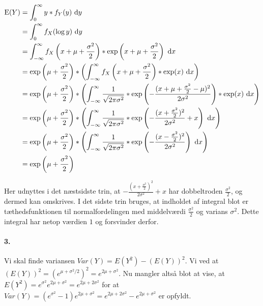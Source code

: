 \begin{align*}
\mathrm{E}(Y)
&= \int_0^\infty y*f_Y(y)\ \mathrm{d} y \\
&= \int_0^\infty f_X(\log y)\ \mathrm{d} y \\
&= \int_{-\infty}^\infty
     f_X\left(x + \mu + \frac{\sigma^2}{2}\right) *
     \mathrm{exp}\left(x + \mu + \frac{\sigma^2}{2}\right)
   \ \mathrm{d} x \\
&= \exp\left(\mu + \frac{\sigma^2}{2}\right) * \left(\int_{-\infty}^\infty
     f_X\left(x + \mu + \frac{\sigma^2}{2}\right) *
     \mathrm{exp}(x)
   \ \mathrm{d} x\right) \\
&= \exp\left(\mu + \frac{\sigma^2}{2}\right) * \left(\int_{-\infty}^\infty
     \frac{1}{\sqrt{2\pi\sigma^2}} *
     \mathrm{exp}\left(-\frac{(x + \mu + \frac{\sigma^2}{2} - \mu)^2}{2\sigma^2}\right) *
     \mathrm{exp}(x)
   \ \mathrm{d} x\right) \\
&= \exp\left(\mu + \frac{\sigma^2}{2}\right) * \left(\int_{-\infty}^\infty
     \frac{1}{\sqrt{2\pi\sigma^2}} *
     \mathrm{exp}\left(-\frac{(x + \frac{\sigma^2}{2})^2}{2\sigma^2} + x\right)
   \ \mathrm{d} x\right) \\
&= \exp\left(\mu + \frac{\sigma^2}{2}\right) * \left(\int_{-\infty}^\infty
     \frac{1}{\sqrt{2\pi\sigma^2}} *
     \mathrm{exp}\left(-\frac{(x - \frac{\sigma^2}{2})^2}{2\sigma^2}\right)
   \ \mathrm{d} x\right) \\
&= \exp\left(\mu + \frac{\sigma^2}{2}\right) \\
\end{align*}

Her udnyttes i det næstsidste trin, at $-\frac{(x + \frac{\sigma^2}{2})^2}{2\sigma^2} + x$ har
dobbeltroden $\frac{\sigma^2}{2}$, og dermed kan omskrives. I det sidste trin
bruges, at indholdet af integral blot er tæthedsfunktionen til
normalfordelingen med middelværdi $\frac{\sigma^2}{2}$ og varians $\sigma^2$.
Dette integral har netop værdien $1$ og forsvinder derfor.

\paragraph{3.} Vi skal finde variansen $Var(Y) = E(Y^2) -
(E(Y))^2$. Vi ved at $(E(Y))^2 = (e^{\mu+\sigma^2 / 2})^2 = e^{2\mu +
  \sigma^2}$. Nu mangler altså blot at vise, at
$E(Y^2)=e^{\sigma^2}e^{2\mu+\sigma^2} = e^{2\mu+ 2\sigma^2}$ for at
$Var(Y) = (e^{\sigma^2} - 1)e^{2\mu+\sigma^2} = e^{2\mu +2\sigma^2} -
e^{2\mu+\sigma^2}$ er opfyldt. %

